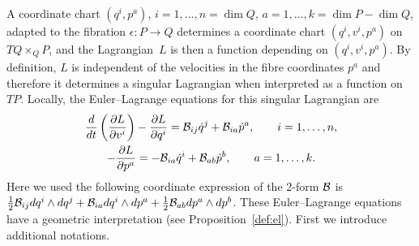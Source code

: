 \documentclass[pdftex]{sigma}
\newcommand{\B}{{\cal B}}
\newcommand{\e}{\epsilon}
\def\fpd#1#2{\frac{\partial #1}{\partial #2}}
\begin{document}
A coordinate chart $(q^i,p^a)$, $i=1,\ldots,n=\dim Q$, $a=1,\ldots,k=\dim P-\dim Q$,  adapted to the f\/ibration $\e: P\to Q$ determines a coordinate chart $(q^i,v^i,p^a)$ on $TQ\times_Q P$, and the Lagrangian~$L$ is then a function depending on $(q^i,v^i,p^a)$. By def\/inition, $L$ is independent of the velocities in the f\/ibre coordinates $p^a$ and therefore it determines a singular Lagrangian when interpreted as a function on $TP$. Locally, the Euler--Lagrange equations for this singular Lagrangian are
\begin{gather*}
\frac{d}{dt}\left(\fpd{L}{v^i}\right) -\fpd{L}{q^i}=\B_{ij} \dot q^j + \B_{ia} \dot p^a,\qquad  i=1,\ldots,n,\\
  -\fpd{L}{p^a}=-\B_{ia} \dot q^i+ \B_{ab}\dot p^b,\qquad a=1,\ldots,k.
\end{gather*}
Here we used the following coordinate expression of the 2-form $\B$ is $\frac12 \B_{ij} dq^i \wedge dq^j + \B_{ia}dq^i\wedge dp^a + \frac12 \B_{ab} dp^a\wedge dp^b$.
These Euler--Lagrange equations have a geometric interpretation (see Proposition~\ref{def:el}). First we introduce additional notations.
\end{document}

